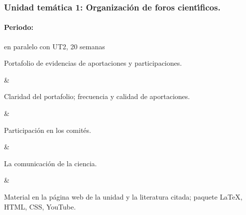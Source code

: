 \subsubsection{Unidad tem\'{a}tica 1: Organizaci\'{o}n de foros cient\'{\i}ficos.}

\paragraph{Periodo:} en paralelo con UT2, 20 semanas



Portafolio de evidencias de aportaciones y participaciones.

&

Claridad del portafolio; frecuencia y calidad de aportaciones.

&

Participaci\'{o}n en los comit\'{e}s.

&

La comunicaci\'{o}n de la ciencia.

&

Material en la p\'{a}gina web de la unidad y la literatura citada;
paquete {\LaTeX}, HTML, CSS, YouTube.



